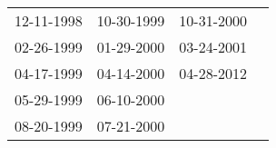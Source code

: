 \begin{supertabular}{llll}
 12-11-1998 &  10-30-1999 &  10-31-2000 \\
 02-26-1999 &  01-29-2000 &  03-24-2001 \\
 04-17-1999 &  04-14-2000 &  04-28-2012 \\
 05-29-1999 &  06-10-2000 &             \\
 08-20-1999 &  07-21-2000 &             \\
\end{supertabular}

